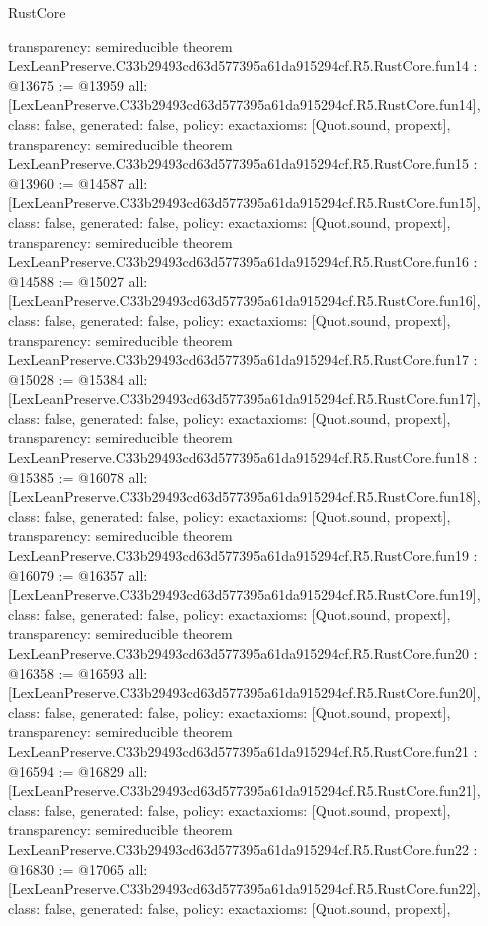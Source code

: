 \begin{lexlean}{RustCore}
\begin{coremodule}
{  transparency: semireducible
}
theorem LexLeanPreserve.C33b29493cd63d577395a61da915294cf.R5.RustCore.fun14 : @13675 := @13959 {
  all: [LexLeanPreserve.C33b29493cd63d577395a61da915294cf.R5.RustCore.fun14],
  class: false,
  generated: false,
  policy: exact{axioms: [Quot.sound, propext]},
  transparency: semireducible
}
theorem LexLeanPreserve.C33b29493cd63d577395a61da915294cf.R5.RustCore.fun15 : @13960 := @14587 {
  all: [LexLeanPreserve.C33b29493cd63d577395a61da915294cf.R5.RustCore.fun15],
  class: false,
  generated: false,
  policy: exact{axioms: [Quot.sound, propext]},
  transparency: semireducible
}
theorem LexLeanPreserve.C33b29493cd63d577395a61da915294cf.R5.RustCore.fun16 : @14588 := @15027 {
  all: [LexLeanPreserve.C33b29493cd63d577395a61da915294cf.R5.RustCore.fun16],
  class: false,
  generated: false,
  policy: exact{axioms: [Quot.sound, propext]},
  transparency: semireducible
}
theorem LexLeanPreserve.C33b29493cd63d577395a61da915294cf.R5.RustCore.fun17 : @15028 := @15384 {
  all: [LexLeanPreserve.C33b29493cd63d577395a61da915294cf.R5.RustCore.fun17],
  class: false,
  generated: false,
  policy: exact{axioms: [Quot.sound, propext]},
  transparency: semireducible
}
theorem LexLeanPreserve.C33b29493cd63d577395a61da915294cf.R5.RustCore.fun18 : @15385 := @16078 {
  all: [LexLeanPreserve.C33b29493cd63d577395a61da915294cf.R5.RustCore.fun18],
  class: false,
  generated: false,
  policy: exact{axioms: [Quot.sound, propext]},
  transparency: semireducible
}
theorem LexLeanPreserve.C33b29493cd63d577395a61da915294cf.R5.RustCore.fun19 : @16079 := @16357 {
  all: [LexLeanPreserve.C33b29493cd63d577395a61da915294cf.R5.RustCore.fun19],
  class: false,
  generated: false,
  policy: exact{axioms: [Quot.sound, propext]},
  transparency: semireducible
}
theorem LexLeanPreserve.C33b29493cd63d577395a61da915294cf.R5.RustCore.fun20 : @16358 := @16593 {
  all: [LexLeanPreserve.C33b29493cd63d577395a61da915294cf.R5.RustCore.fun20],
  class: false,
  generated: false,
  policy: exact{axioms: [Quot.sound, propext]},
  transparency: semireducible
}
theorem LexLeanPreserve.C33b29493cd63d577395a61da915294cf.R5.RustCore.fun21 : @16594 := @16829 {
  all: [LexLeanPreserve.C33b29493cd63d577395a61da915294cf.R5.RustCore.fun21],
  class: false,
  generated: false,
  policy: exact{axioms: [Quot.sound, propext]},
  transparency: semireducible
}
theorem LexLeanPreserve.C33b29493cd63d577395a61da915294cf.R5.RustCore.fun22 : @16830 := @17065 {
  all: [LexLeanPreserve.C33b29493cd63d577395a61da915294cf.R5.RustCore.fun22],
  class: false,
  generated: false,
  policy: exact{axioms: [Quot.sound, propext]},
}
\end{coremodule}
\end{lexlean}

